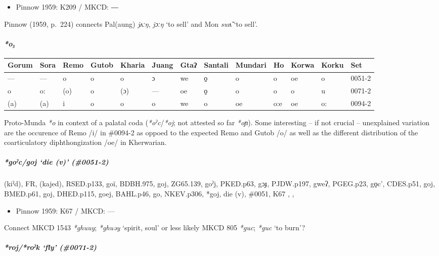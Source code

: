 \documentclass[a4paper,]{article}
\providecommand{\tightlist}{%
  \setlength{\itemsep}{0pt}\setlength{\parskip}{0pt}}
\let\oldparagraph\paragraph
\renewcommand{\paragraph}[1]{\oldparagraph{#1}\mbox{}}
\let\oldsubparagraph\subparagraph
\renewcommand{\subparagraph}[1]{\oldsubparagraph{#1}\mbox{}}
\begin{document}
\begin{itemize}
\tightlist
\item
  Pinnow 1959: K209 / MKCD: ―
\end{itemize}

Pinnow (1959, p.~224) connects Pal(aung) \emph{jʌːŋ}, \emph{jɔːŋ} `to
sell' and Mon \emph{swʌ̃} `to sell'.

\paragraph{\texorpdfstring{\emph{*o₃}}{*o₃}}\label{o-2}

\begin{longtable}[]{@{}lllllllllllll@{}}
\toprule
Gorum & Sora & Remo & Gutob & Kharia & Juang & Gtaʔ & Santali & Mundari
& Ho & Korwa & Korku & Set\tabularnewline
\midrule
\endhead
--- & --- & o & o & o & ɔ & we & o̠ & o & o & oe & o &
0051-2\tabularnewline
o & o: & (o) & o & (ɔ) & --- & oe & o̠ & o & o & o & u &
0071-2\tabularnewline
(a) & (a) & i & o & o & o & we & o & oe & o:e & oe & o: &
0094-2\tabularnewline
\bottomrule
\end{longtable}

Proto-Munda \emph{*o} in context of a palatal coda
(\emph{*oˀc}/\emph{*oj}; not attested so far \emph{*oɲ}). Some
interesting -- if not crucial -- unexplained variation are the occurence
of Remo /i/ in \#0094-2 as oppoed to the expected Remo and Gutob /o/ as
well as the different distribution of the coarticulatory
diphthongization /oe/ in Kherwarian.

\subparagraph{\texorpdfstring{\emph{*goˀc/goj} `die (v)'
(\#0051-2)}{*goˀc/goj die (v) (\#0051-2)}}\label{goux2c0cgoj-die-v-0051-2}

(kiˀd), FR, (kajed), RSED.p133, goĭ, BDBH.975, goj, ZG65.139, goˀj,
PKED.p63, gɔɟ, PJDW.p197, gweʔ, PGEG.p23, go̠c', CDES.p51, goj, BMED.p61,
goj, DHED.p115, goej, BAHL.p46, go, NKEV.p306, *goj, die (v), \#0051,
K67 , ,

\begin{itemize}
\tightlist
\item
  Pinnow 1959: K67 / MKCD: ---
\end{itemize}

Connect MKCD 1543 \emph{*ghuuy}; \emph{*ghuəy} `spirit, soul' or less
likely MKCD 805 \emph{*guc}; \emph{*guc} `to burn'?

\subparagraph{\texorpdfstring{\emph{*roj}/\emph{*roˀk} `fly'
(\#0071-2)}{*roj/*roˀk fly (\#0071-2)}}\label{rojroux2c0k-fly-0071-2}
\end{document}
